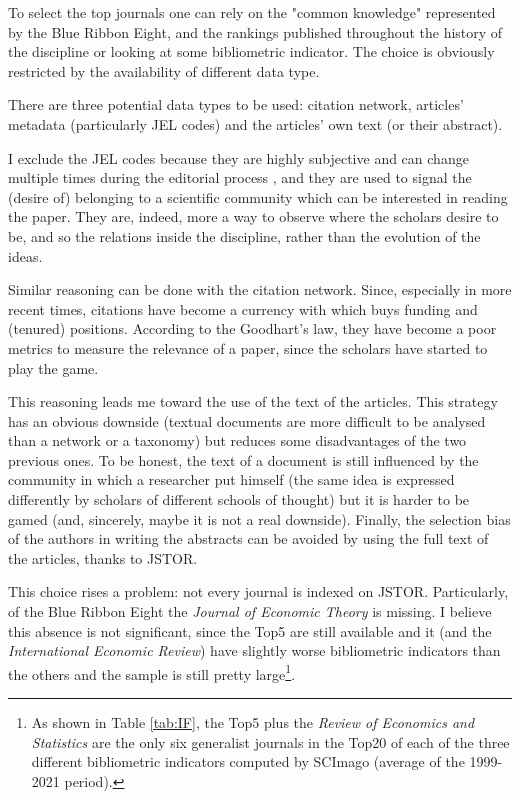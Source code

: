 \documentclass[a4paper, 11pt, headings=standardclasses, tablecaptionsbelow]{scrartcl}
\begin{document}
To select the top journals one can rely on the "common knowledge" represented by the Blue Ribbon Eight, and the rankings published throughout the history of the discipline or looking at some bibliometric indicator. The choice is obviously restricted by the availability of different data type.

There are three potential data types to be used: citation network, articles' metadata (particularly JEL codes) and the articles' own text (or their abstract).

I exclude the JEL codes because they are highly subjective and can change multiple times during the editorial process \parencite{kosnik2018}, and they are used to signal the (desire of) belonging to a scientific community which can be interested in reading the paper. They are, indeed, more a way to observe where the scholars desire to be, and so the relations inside the discipline, rather than the evolution of the ideas.

Similar reasoning can be done with the citation network. Since, especially in more recent times, citations have become a currency with which buys funding and (tenured) positions. According to the Goodhart's law, they have become a poor metrics to measure the relevance of a paper, since the scholars have started to play the game.

This reasoning leads me toward the use of the text of the articles. This strategy has an obvious downside (textual documents are more difficult to be analysed than a network or a taxonomy) but reduces some disadvantages of the two previous ones.
To be honest, the text of a document is still influenced by the community in which a researcher put himself (the same idea is expressed differently by scholars of different schools of thought) but it is harder to be gamed (and, sincerely, maybe it is not a real downside).
Finally, the selection bias of the authors in writing the abstracts can be avoided by using the full text of the articles, thanks to JSTOR.



This choice rises a problem: not every journal is indexed on JSTOR. Particularly, of the Blue Ribbon Eight the \textit{Journal of Economic Theory} is missing. I believe this absence is not significant, since the Top5 are still available and it (and the \textit{International Economic Review}) have slightly worse bibliometric indicators than the others and the sample is still pretty large\footnote{As shown in Table \ref{tab:IF}, the Top5 plus the \textit{Review of Economics and Statistics} are the only six generalist journals in the Top20 of each of the three different bibliometric indicators computed by SCImago (average of the 1999-2021 period).}.
\end{document}
